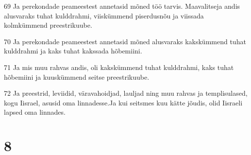 \par 69 Ja perekondade peameestest annetasid mõned töö tarvis. Maavalitseja andis alusvaraks tuhat kulddrahmi, viiskümmend piserdusnõu ja viissada kolmkümmend preestrikuube.
\par 70 Ja perekondade peameestest annetasid mõned alusvaraks kakskümmend tuhat kulddrahmi ja kaks tuhat kakssada hõbemiini.
\par 71 Ja mis muu rahvas andis, oli kakskümmend tuhat kulddrahmi, kaks tuhat hõbemiini ja kuuskümmend seitse preestrikuube.
\par 72 Ja preestrid, leviidid, väravahoidjad, lauljad ning muu rahvas ja templisulased, kogu Iisrael, asusid oma linnadesse.Ja kui seitsmes kuu kätte jõudis, olid Iisraeli lapsed oma linnades.

\chapter{8}


